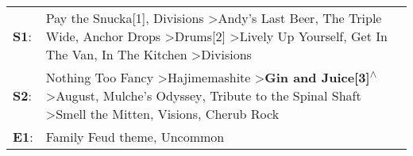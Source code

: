 \begin{supertabular}{p{0.03\textwidth}p{0.92\textwidth}}
 \textbf{S1}:  &  Pay the Snucka[1]\textsuperscript{}, \enspace Divisions\textsuperscript{} \textgreater \enspace Andy's Last Beer\textsuperscript{}, \enspace The Triple Wide\textsuperscript{}, \enspace Anchor Drops\textsuperscript{} \textgreater \enspace Drums[2]\textsuperscript{} \textgreater \enspace Lively Up Yourself\textsuperscript{}, \enspace Get In The Van\textsuperscript{}, \enspace In The Kitchen\textsuperscript{} \textgreater \enspace Divisions\textsuperscript{}  \enspace  \\
 \textbf{S2}:  &                 Nothing Too Fancy\textsuperscript{} \textgreater \enspace Hajimemashite\textsuperscript{} \textgreater \enspace \textbf{Gin and Juice[3]\textsuperscript{$\wedge$}} \textgreater \enspace August\textsuperscript{}, \enspace Mulche's Odyssey\textsuperscript{}, \enspace Tribute to the Spinal Shaft\textsuperscript{} \textgreater \enspace Smell the Mitten\textsuperscript{}, \enspace Visions\textsuperscript{}, \enspace Cherub Rock\textsuperscript{}  \enspace  \\
 \textbf{E1}:  &                                                                                                                                                                                                                                                                                                                                                                                                     Family Feud theme\textsuperscript{}, \enspace Uncommon\textsuperscript{}  \enspace  \\
\end{supertabular}
